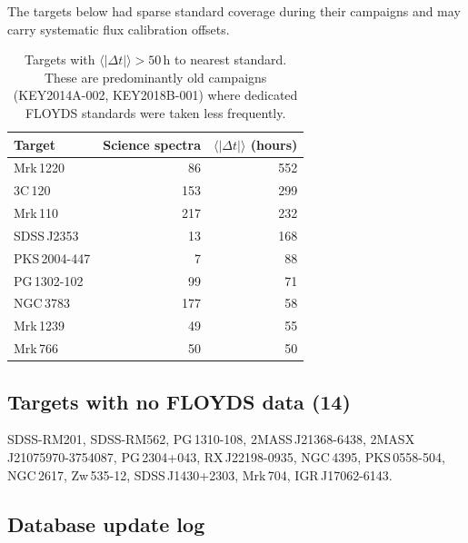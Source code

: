 \documentclass[12pt,a4paper]{article}
\begin{document}
The targets below had sparse standard coverage during their campaigns and
may carry systematic flux calibration offsets.

\begin{table}[h!]
\centering
\small
\begin{tabular}{lrr}
\toprule
Target & Science spectra & $\langle|\Delta t|\rangle$ (hours) \\
\midrule
Mrk\,1220      &  86 & 552 \\
3C\,120        & 153 & 299 \\
Mrk\,110       & 217 & 232 \\
SDSS\,J2353    &  13 & 168 \\
PKS\,2004-447  &   7 &  88 \\
PG\,1302-102   &  99 &  71 \\
NGC\,3783      & 177 &  58 \\
Mrk\,1239      &  49 &  55 \\
Mrk\,766       &  50 &  50 \\
\bottomrule
\end{tabular}
\caption{Targets with $\langle|\Delta t|\rangle > 50$\,h to nearest standard.
  These are predominantly old campaigns (KEY2014A-002, KEY2018B-001) where
  dedicated FLOYDS standards were taken less frequently.}
\end{table}

\subsection{Targets with no FLOYDS data (14)}

SDSS-RM201, SDSS-RM562, PG\,1310-108, 2MASS\,J21368-6438,
2MASX\,J21075970-3754087, PG\,2304+043, RX\,J22198-0935, NGC\,4395,
PKS\,0558-504, NGC\,2617, Zw\,535-12, SDSS\,J1430+2303, Mrk\,704,
IGR\,J17062-6143.

\subsection{Database update log}
\end{document}
